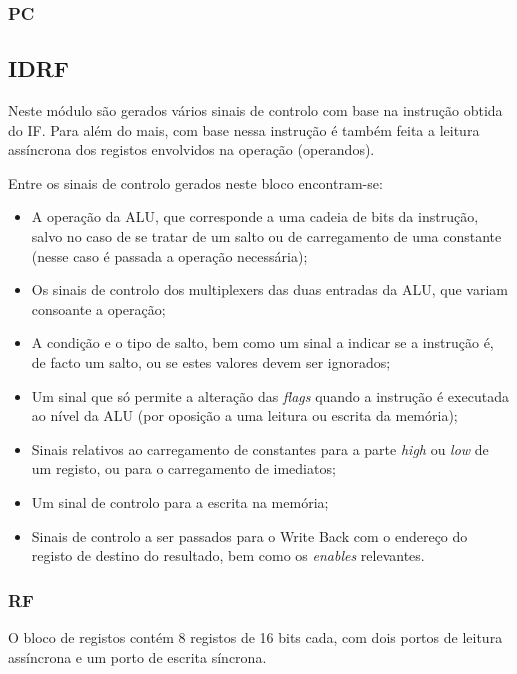 \documentclass[a4paper]{article}
\begin{document}
			\subsubsection{PC}
		
		\subsection{IDRF}
			
			Neste módulo são gerados vários sinais de controlo com base na instrução obtida do IF. Para além do mais, com base nessa instrução é também feita a leitura assíncrona dos registos envolvidos na operação (operandos).
			
			Entre os sinais de controlo gerados neste bloco encontram-se:
			
			\begin{itemize}
				\item A operação da ALU, que corresponde a uma cadeia de bits da instrução, salvo no caso de se tratar de um salto ou de carregamento de uma constante (nesse caso é passada a operação necessária);
				\item Os sinais de controlo dos multiplexers das duas entradas da ALU, que variam consoante a operação;
				\item A condição e o tipo de salto, bem como um sinal a indicar se a instrução é, de facto um salto, ou se estes valores devem ser ignorados;
				\item Um sinal que só permite a alteração das \textit{flags} quando a instrução é executada ao nível da ALU (por oposição a uma leitura ou escrita da memória);
				\item Sinais relativos ao carregamento de constantes para a parte \textit{high} ou \textit{low} de um registo, ou para o carregamento de imediatos;
				\item Um sinal de controlo para a escrita na memória;
				\item Sinais de controlo a ser passados para o Write Back com o endereço do registo de destino do resultado, bem como os \textit{enables} relevantes.
			\end{itemize}
			
			\subsubsection{RF}
				
				O bloco de registos contém 8 registos de 16 bits cada, com dois portos de leitura assíncrona e um porto de escrita síncrona.
				
\end{document}
